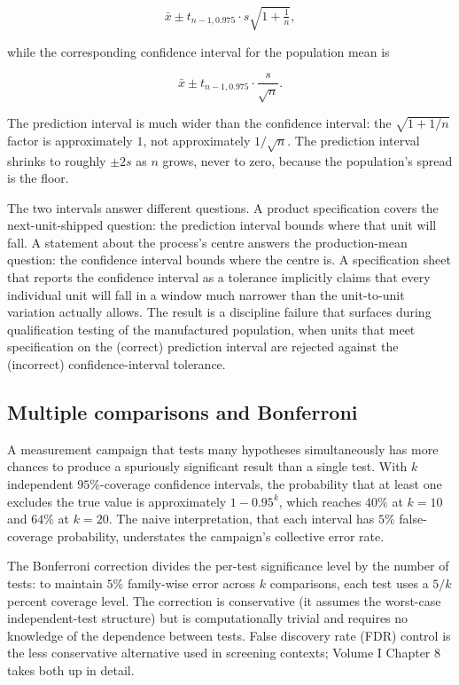 \[
\bar{x} \pm t_{n-1, 0.975} \cdot s \sqrt{1 + \tfrac{1}{n}},
\]

while the corresponding confidence interval for the population mean
is

\[
\bar{x} \pm t_{n-1, 0.975} \cdot \frac{s}{\sqrt{n}}.
\]

The prediction interval is much wider than the confidence interval:
the $\sqrt{1 + 1/n}$ factor is approximately $1$, not approximately
$1/\sqrt{n}$. The prediction interval shrinks to roughly $\pm 2s$
as $n$ grows, never to zero, because the population's spread is the
floor.

The two intervals answer different questions. A product
specification covers the next-unit-shipped question: the prediction
interval bounds where that unit will fall. A statement about the
process's centre answers the production-mean question: the
confidence interval bounds where the centre is. A specification
sheet that reports the confidence interval as a tolerance
implicitly claims that every individual unit will fall in a
window much narrower than the unit-to-unit variation actually
allows. The result is a discipline failure that surfaces during
qualification testing of the manufactured population, when units
that meet specification on the (correct) prediction interval are
rejected against the (incorrect) confidence-interval tolerance.

\subsection{Multiple comparisons and Bonferroni}

A measurement campaign that tests many hypotheses simultaneously
has more chances to produce a spuriously significant result than a
single test. With $k$ independent $95\%$-coverage confidence
intervals, the probability that at least one excludes the true
value is approximately $1 - 0.95^{k}$, which reaches $40\%$ at
$k = 10$ and $64\%$ at $k = 20$. The naive interpretation, that
each interval has $5\%$ false-coverage probability, understates the
campaign's collective error rate.

The Bonferroni correction divides the per-test significance level
by the number of tests: to maintain $5\%$ family-wise error across
$k$ comparisons, each test uses a $5/k$ percent coverage level.
The correction is conservative (it assumes the worst-case
independent-test structure) but is computationally trivial and
requires no knowledge of the dependence between tests. False
discovery rate (FDR) control is the less conservative alternative
used in screening contexts; Volume I Chapter 8 takes both up in
detail.

